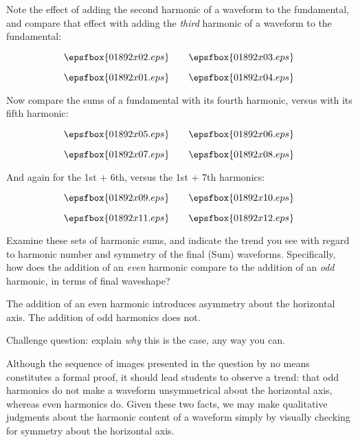 

Note the effect of adding the second harmonic of a waveform to the fundamental, and compare that effect with adding the {\it third} harmonic of a waveform to the fundamental:

$$\epsfbox{01892x02.eps} \hskip 20pt \epsfbox{01892x03.eps}$$

$$\epsfbox{01892x01.eps} \hskip 20pt \epsfbox{01892x04.eps}$$

Now compare the sums of a fundamental with its fourth harmonic, versus with its fifth harmonic:

$$\epsfbox{01892x05.eps} \hskip 20pt \epsfbox{01892x06.eps}$$

$$\epsfbox{01892x07.eps} \hskip 20pt \epsfbox{01892x08.eps}$$

And again for the 1st + 6th, versus the 1st + 7th harmonics:

$$\epsfbox{01892x09.eps} \hskip 20pt \epsfbox{01892x10.eps}$$

$$\epsfbox{01892x11.eps} \hskip 20pt \epsfbox{01892x12.eps}$$

Examine these sets of harmonic sums, and indicate the trend you see with regard to harmonic number and symmetry of the final (Sum) waveforms.  Specifically, how does the addition of an {\it even} harmonic compare to the addition of an {\it odd} harmonic, in terms of final waveshape?







The addition of an even harmonic introduces asymmetry about the horizontal axis.  The addition of odd harmonics does not.

\vskip 10pt

Challenge question: explain {\it why} this is the case, any way you can.







Although the sequence of images presented in the question by no means constitutes a formal proof, it should lead students to observe a trend: that odd harmonics do not make a waveform unsymmetrical about the horizontal axis, whereas even harmonics do.  Given these two facts, we may make qualitative judgments about the harmonic content of a waveform simply by visually checking for symmetry about the horizontal axis.

